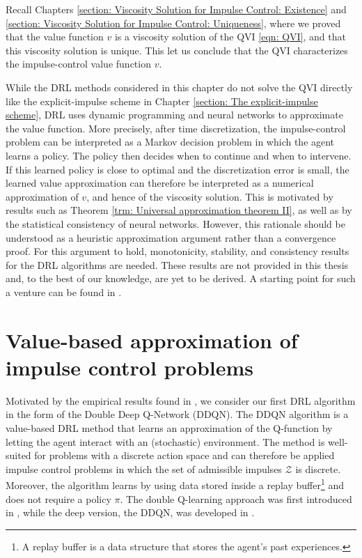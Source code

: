 \begin{remark}
    Recall Chapters \ref{section: Viscosity Solution for Impulse Control: Existence} and \ref{section: Viscosity Solution for Impulse Control: Uniqueness}, where we proved that the value function $v$ is a viscosity solution of the QVI \eqref{eqn: QVI}, and that this viscosity solution is unique. This let us conclude that the QVI characterizes the impulse-control value function $v$. 

    While the DRL methods considered in this chapter do not solve the QVI directly like the explicit-impulse scheme in Chapter \ref{section: The explicit-impulse scheme}, DRL uses dynamic programming and neural networks to approximate the value function. More precisely, after time discretization, the impulse-control problem can be interpreted as a Markov decision problem in which the agent learns a policy. The policy then decides when to continue and when to intervene. If this learned policy is close to optimal and the discretization error is small, the learned value approximation can therefore be interpreted as a numerical approximation of $v$, and hence of the viscosity solution. This is motivated by results such as Theorem \ref{trm: Universal approximation theorem II}, as well as by the statistical consistency of neural networks. However, this rationale should be understood as a heuristic approximation argument rather than a convergence proof. For this argument to hold, monotonicity, stability, and consistency results for the DRL algorithms are needed. These results are not provided in this thesis and, to the best of our knowledge, are yet to be derived. A starting point for such a venture can be found in \cite{bayraktar2023approximate}. 
\end{remark}

\section{Value-based approximation of impulse control problems}
\label{section: Value-based Approximation of the Impulse-Control Problem}
Motivated by the empirical results found in \cite{anchuri2026rammstein}, we consider our first DRL algorithm in the form of the Double Deep Q-Network (DDQN). The DDQN algorithm is a value-based DRL method that learns an approximation of the Q-function by letting the agent interact with an (stochastic) environment. The method is well-suited for problems with a discrete action space and can therefore be applied impulse control problems in which the set of admissible impulses $\mathcal{Z}$ is discrete. Moreover, the algorithm learns by using data stored inside a replay buffer\footnote{A replay buffer is a data structure that stores the agent's past experiences.} and does not require a policy $\pi$. The double Q-learning approach was first introduced in \cite{hasselt2010double}, while the deep version, the DDQN, was developed in \cite{van2016deep}. 

